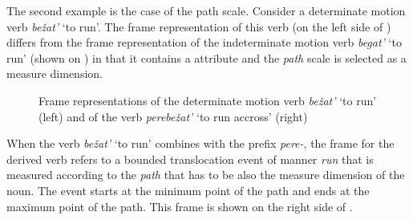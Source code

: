 The second example is the case of the path scale. Consider a determinate motion verb \textit{be\v{z}at'} `to run'. The frame representation of this verb (on the left side of ) differs from the frame representation of the indeterminate motion verb \textit{begat'} `to run' (shown on ) in that it contains a \PATH attribute and the \textit{path} scale is selected as a measure dimension. 

\begin{figure}
\begin{minipage}{0.4\textwidth}
\end{minipage}
\begin{minipage}{0.55\textwidth}
\end{minipage}
\caption{Frame representations of the determinate motion verb \textit{be\v{z}at'} `to run' (left) and of the verb \textit{perebe\v{z}at'} `to run accross' (right) \label{frame:bezhat}}
\end{figure}

When the verb \textit{be\v{z}at'} `to run' combines with the prefix \textit{pere-}, the frame for the derived verb refers to a bounded translocation event of manner \textit{run} that is measured according to the \textit{path} that has to be also the measure dimension of the noun. The event starts at the minimum point of the path and ends at the maximum point of the path. This frame is shown on the right side of .

